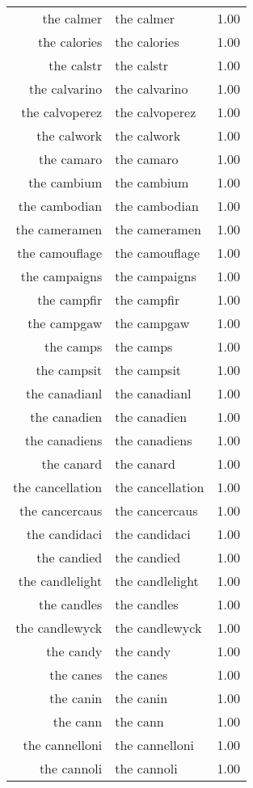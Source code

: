 \begin{table}[ht]
\begin{tabular}{rlr}
  the calmer & the calmer & 1.00 \\ 
  the calories & the calories & 1.00 \\ 
  the calstr & the calstr & 1.00 \\ 
  the calvarino & the calvarino & 1.00 \\ 
  the calvoperez & the calvoperez & 1.00 \\ 
  the calwork & the calwork & 1.00 \\ 
  the camaro & the camaro & 1.00 \\ 
  the cambium & the cambium & 1.00 \\ 
  the cambodian & the cambodian & 1.00 \\ 
  the cameramen & the cameramen & 1.00 \\ 
  the camouflage & the camouflage & 1.00 \\ 
  the campaigns & the campaigns & 1.00 \\ 
  the campfir & the campfir & 1.00 \\ 
  the campgaw & the campgaw & 1.00 \\ 
  the camps & the camps & 1.00 \\ 
  the campsit & the campsit & 1.00 \\ 
  the canadianl & the canadianl & 1.00 \\ 
  the canadien & the canadien & 1.00 \\ 
  the canadiens & the canadiens & 1.00 \\ 
  the canard & the canard & 1.00 \\ 
  the cancellation & the cancellation & 1.00 \\ 
  the cancercaus & the cancercaus & 1.00 \\ 
  the candidaci & the candidaci & 1.00 \\ 
  the candied & the candied & 1.00 \\ 
  the candlelight & the candlelight & 1.00 \\ 
  the candles & the candles & 1.00 \\ 
  the candlewyck & the candlewyck & 1.00 \\ 
  the candy & the candy & 1.00 \\ 
  the canes & the canes & 1.00 \\ 
  the canin & the canin & 1.00 \\ 
  the cann & the cann & 1.00 \\ 
  the cannelloni & the cannelloni & 1.00 \\ 
  the cannoli & the cannoli & 1.00 \\ 

\end{tabular}
\end{table}
